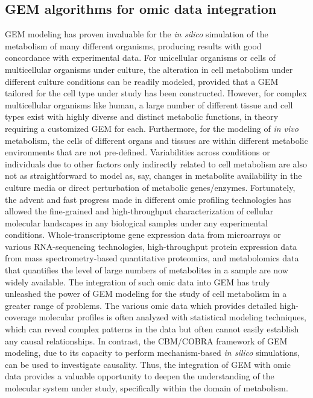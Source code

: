 \documentclass[12pt,twoside,openany,\mydriver]{thesis}  %
\begin{document}
\hypertarget{gem-algorithms-for-omic-data-integration}{%
\subsection{GEM algorithms for omic data integration}\label{gem-algorithms-for-omic-data-integration}}

GEM modeling has proven invaluable for the \emph{in silico} simulation of the metabolism of many different organisms, producing results with good concordance with experimental data. For unicellular organisms or cells of multicellular organisms under culture, the alteration in cell metabolism under different culture conditions can be readily modeled, provided that a GEM tailored for the cell type under study has been constructed. However, for complex multicellular organisms like human, a large number of different tissue and cell types exist with highly diverse and distinct metabolic functions, in theory requiring a customized GEM for each. Furthermore, for the modeling of \emph{in vivo} metabolism, the cells of different organs and tissues are within different metabolic environments that are not pre-defined. Variabilities across conditions or individuals due to other factors only indirectly related to cell metabolism are also not as straightforward to model as, say, changes in metabolite availability in the culture media or direct perturbation of metabolic genes/enzymes. Fortunately, the advent and fast progress made in different omic profiling technologies has allowed the fine-grained and high-throughput characterization of cellular molecular landscapes in any biological samples under any experimental conditions. Whole-transcriptome gene expression data from microarrays or various RNA-sequencing technologies, high-throughput protein expression data from mass spectrometry-based quantitative proteomics, and metabolomics data that quantifies the level of large numbers of metabolites in a sample are now widely available. The integration of such omic data into GEM has truly unleashed the power of GEM modeling for the study of cell metabolism in a greater range of problems. The various omic data which provides detailed high-coverage molecular profiles is often analyzed with statistical modeling techniques, which can reveal complex patterns in the data but often cannot easily establish any causal relationships. In contrast, the CBM/COBRA framework of GEM modeling, due to its capacity to perform mechanism-based \emph{in silico} simulations, can be used to investigate causality. Thus, the integration of GEM with omic data provides a valuable opportunity to deepen the understanding of the molecular system under study, specifically within the domain of metabolism.
\end{document}
